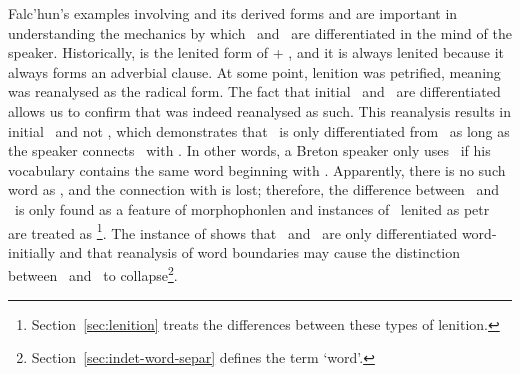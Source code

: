 Falc'hun's examples involving  and its derived forms  and   are important in understanding the mechanics by which \xD\ and \lT\ are differentiated in the mind of the speaker. Historically,  is the lenited form of  + , and it is always lenited because it always forms an adverbial clause. At some point, lenition was petrified, meaning   was reanalysed as the radical form. The fact that initial \xD\ and \lT\ are differentiated  allows us to confirm that  was indeed reanalysed as such. This reanalysis results in initial \xD\ and not \lT, which demonstrates that \lT\ is only differentiated from \xD\ as long as the speaker connects \lT\ with \xT. In other words, a Breton speaker only uses \lT\ if his vocabulary contains the same word beginning with \xT. Apparently, there is no such word as , and the connection with  is lost; therefore, the difference between \lT\ and \xD\ is only found as a feature of \gls{morphophonlen} and instances of \lT\ lenited as \gls{petr} are treated as \xD\footnote{ Section~\ref{sec:lenition} treats the differences between these types of lenition.}. The instance of  shows  that \lT\ and \xD\ are only differentiated word-initially and that reanalysis of word boundaries may cause the distinction between \lT\ and \xD\ to collapse\footnote{Section~\ref{sec:indet-word-separ} defines the term `word'.}.






